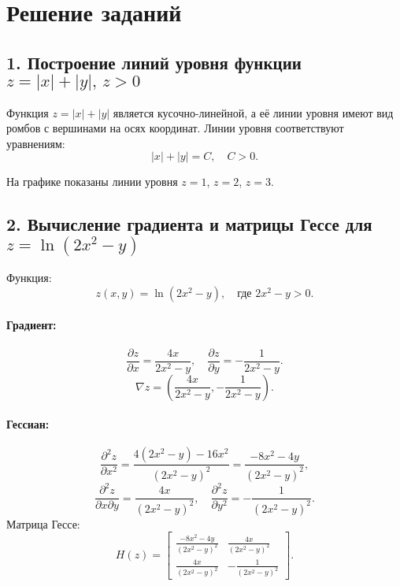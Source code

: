 \documentclass[a4paper,12pt]{article}
\begin{document}
\section*{Решение заданий}

\subsection*{1. Построение линий уровня функции \( z = |x| + |y|, \, z > 0 \)}

Функция \( z = |x| + |y| \) является кусочно-линейной, а её линии уровня имеют вид ромбов с вершинами на осях координат. Линии уровня соответствуют уравнениям:
\[
|x| + |y| = C, \quad C > 0.
\]
    
\begin{center}
\end{center}

На графике показаны линии уровня \( z = 1 \), \( z = 2 \), \( z = 3 \).

\subsection*{2. Вычисление градиента и матрицы Гессе для \( z = \ln(2x^2 - y) \)}

Функция:
\[
z(x, y) = \ln(2x^2 - y), \quad \text{где } 2x^2 - y > 0.
\]

\paragraph{Градиент:}
\[
\frac{\partial z}{\partial x} = \frac{4x}{2x^2 - y}, \quad
\frac{\partial z}{\partial y} = -\frac{1}{2x^2 - y}.
\]
\[
\nabla z = \left( \frac{4x}{2x^2 - y}, -\frac{1}{2x^2 - y} \right).
\]

\paragraph{Гессиан:}
\[
\frac{\partial^2 z}{\partial x^2} = \frac{4(2x^2 - y) - 16x^2}{(2x^2 - y)^2} = \frac{-8x^2 - 4y}{(2x^2 - y)^2},
\]
\[
\frac{\partial^2 z}{\partial x \partial y} = \frac{4x}{(2x^2 - y)^2}, \quad
\frac{\partial^2 z}{\partial y^2} = -\frac{1}{(2x^2 - y)^2}.
\]
Матрица Гессе:
\[
H(z) =
\begin{bmatrix}
\frac{-8x^2 - 4y}{(2x^2 - y)^2} & \frac{4x}{(2x^2 - y)^2} \\
\frac{4x}{(2x^2 - y)^2} & -\frac{1}{(2x^2 - y)^2}
\end{bmatrix}.
\]
\end{document}
